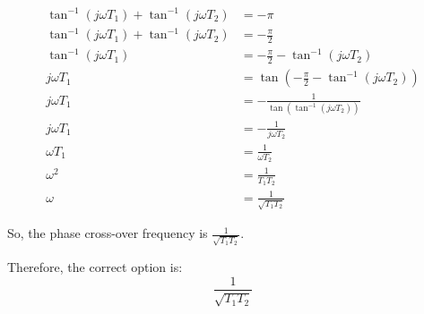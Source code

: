\documentclass[journal,12pt,twocolumn]{IEEEtran}
\begin{document}
\begin{align}
\tan^{-1}(j\omega T_1) + \tan^{-1}(j\omega T_2) &= -\pi \\
\tan^{-1}(j\omega T_1) + \tan^{-1}(j\omega T_2) &= -\frac{\pi}{2} \\
\tan^{-1}(j\omega T_1) &= -\frac{\pi}{2} - \tan^{-1}(j\omega T_2) \\
j\omega T_1 &= \tan\left(-\frac{\pi}{2} - \tan^{-1}(j\omega T_2)\right) \\
j\omega T_1 &= -\frac{1}{\tan(\tan^{-1}(j\omega T_2))} \\
j\omega T_1 &= -\frac{1}{j\omega T_2} \\
\omega T_1 &= \frac{1}{\omega T_2} \\
\omega^2 &= \frac{1}{T_1 T_2} \\
\omega &= \frac{1}{\sqrt{T_1 T_2}}
\end{align}

So, the phase cross-over frequency is \( \frac{1}{\sqrt{T_1 T_2}} \).

Therefore, the correct option is:
\[ \boxed{\frac{1}{\sqrt{T_1 T_2}}} \]
\end{document}
